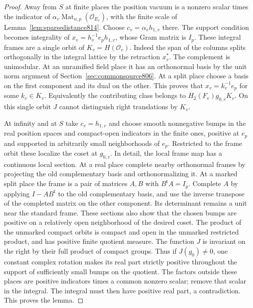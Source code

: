 \documentclass[a4paper,11pt]{article}
\theoremstyle{definition}
\theoremstyle{remark}
\numberwithin{equation}{section}
\begin{document}
\begin{proof}
Away from \(S\) at finite places the position vacuum is a
nonzero scalar times the indicator of
\(\alpha_v\operatorname{Mat}_{n,p}(\mathcal O_{E_v})\), with
the finite scale of Lemma~\ref{lem:sparsedistance814}. Choose
\(c_v=\alpha_v h_{1,v}\) there. The support condition becomes
integrality of \(x_v=h_v^{-1}e_p h_{1,v}\), whose Gram matrix
is \(I_p\). These integral frames are a single orbit of
\(K_v=H(\mathcal O_v)\). Indeed the span of the columns splits
orthogonally in the integral lattice by the retraction \(x_v^*\).
The complement is unimodular. At an unramified field place
it has an orthonormal basis by the unit norm argument of
Section~\ref{sec:commonsource806}. At a split place choose
a basis on the first component and its dual on the other.
This proves that \(x_v=k_v^{-1}e_p\) for some \(k_v\in K_v\).
Equivalently the contributing class belongs to
\(H_2(F_v)g_{0,v}K_v\). On this single orbit \(J\) cannot
distinguish right translations by \(K_v\).

At infinity and at \(S\) take \(c_v=h_{1,v}\) and choose smooth
nonnegative bumps in the real position spaces and compact-open
indicators in the finite ones, positive at \(e_p\) and supported
in arbitrarily small neighborhoods of \(e_p\). Restricted to
the frame orbit these localize the coset at \(g_{0,v}\).
In detail, the local frame map has a continuous local section.
At a real place complete nearby orthonormal frames by projecting
the old complementary basis and orthonormalizing it. At a
marked split place the frame is a pair of matrices \(A,B\) with
\(B^{\mathsf t}A=I_p\). Complete \(A\) by applying
\(I-AB^{\mathsf t}\) to the old complementary basis, and use
the inverse transpose of the completed matrix on the other
component. Its determinant remains a unit near the standard
frame. These sections also show that the chosen bumps are
positive on a relatively open neighborhood of the desired
coset. The product of the unmarked compact orbits is compact
and open in the unmarked restricted product, and has positive
finite quotient measure. The function \(J\) is invariant on
the right by their full product of compact groups. Thus if
\(J(g_0)\ne0\), one constant complex rotation makes its real
part strictly positive throughout the support of sufficiently
small bumps on the quotient. The factors outside these places
are positive indicators times a common nonzero scalar; remove
that scalar in the integral. The integral must then have positive
real part, a contradiction. This proves the lemma.
\end{proof}
\end{document}
